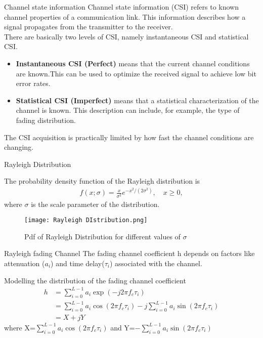 \documentclass{beamer}
\begin{document}
\begin{frame}{Channel state information}
Channel state information (CSI) refers to known channel properties of a communication link. This information describes how a signal propagates from the transmitter to the receiver.\\
There are basically two levels of CSI, namely instantaneous CSI and statistical CSI. 
\begin{block}{}
\begin{itemize}
    \item \textbf{Instantaneous CSI (Perfect)} means that the current channel conditions are known.This can be used to optimize the received signal to achieve low bit error rates.
    \item \textbf{Statistical CSI (Imperfect)} means that a statistical characterization of the channel is known. This description can include, for example, the type of fading distribution.
\end{itemize}
The CSI acquisition is practically limited by how fast the channel conditions are changing. 
\end{block}
\end{frame}
\begin{frame}{Rayleigh Distribution }
\begin{block}{}
 The probability density function of the Rayleigh distribution is
\begin{align}
    { f(x;\sigma )={\frac {x}{\sigma ^{2}}}e^{-x^{2}/(2\sigma ^{2})},\quad x\geq 0,}  
\end{align}
where  $\sigma$ is the scale parameter of the distribution.
\end{block}
  \begin{figure}
    \centering
    \texttt{[image: Rayleigh DIstribution.png]}
    \caption{Pdf of Rayleigh Distribution for different values of $\sigma$}
    \label{4}
\end{figure}   
\end{frame}
\begin{frame}{Rayleigh fading Channel}
The fading channel coefficient h depends on factors like attenuation ($a_i$) and time delay($\tau_i$) associated with the channel. 
\begin{block}{Modelling the distribution of the fading channel coefficient}
\begin{align}
    h&=\sum_{i=0}^{L-1}a_i\exp{(-j2\pi f_c \tau_i)}\\
    &=\sum_{i=0}^{L-1}a_i\cos{(2\pi f_c \tau_i)}-j\sum_{i=0}^{L-1}a_i\sin{(2\pi f_c \tau_i)}\\
    &=X+jY
\end{align}
where X=$\sum_{i=0}^{L-1}a_i\cos{(2\pi f_c \tau_i)}$ and Y=$-\sum_{i=0}^{L-1}a_i\sin{(2\pi f_c \tau_i)}$
\end{block}
\end{frame}
\end{document}
